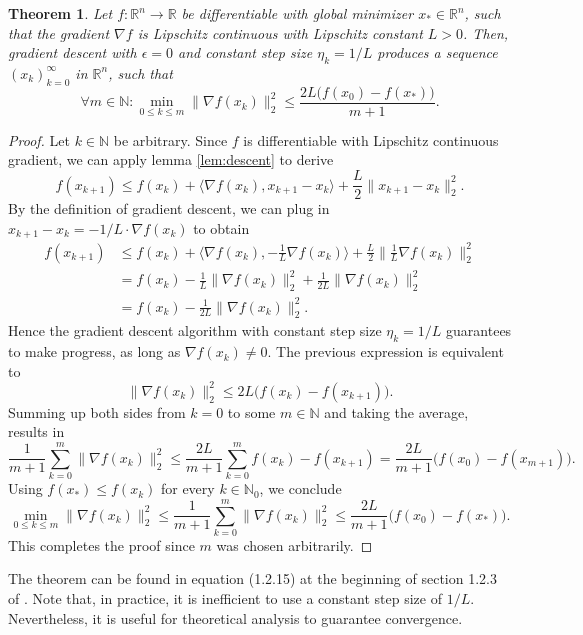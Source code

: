 \documentclass[11pt, a4paper]{article}
\newtheorem{theorem}{Theorem}[section]
\newcommand{\N}{\mathbb{N}}
\newcommand{\R}{\mathbb{R}}
\begin{document}
\begin{theorem} \label{thm:descent}
Let $f: \R^n \to \R$ be differentiable with global minimizer $x_* \in \R^n$, such that the gradient $\nabla f$ is Lipschitz continuous with Lipschitz constant $L>0$. Then, gradient descent with $\epsilon = 0$ and constant step size $\eta_k = 1/L$ produces a sequence $(x_k)_{k=0}^\infty$ in $\R^n$, such that 
\[ \forall m \in \N : \min_{0 \leq k \leq m} \big \| \nabla f(x_k) \big \|_2^2 \leq \frac{2L \big ( f(x_0) - f(x_*) \big )}{m+1}. \]
\end{theorem}

\begin{proof}
Let $k \in \N$ be arbitrary. Since $f$ is differentiable with Lipschitz continuous gradient, we can apply lemma \ref{lem:descent} to derive
\[  f(x_{k+1}) \leq f(x_k) + \big \langle \nabla f(x_k) , x_{k+1} -x_k \big \rangle + \frac{L}{2} \big \| x_{k+1} - x_k \big \|_2^2. \]
By the definition of gradient descent, we can plug in $x_{k+1} - x_k = - 1/L \cdot \nabla f(x_k)$ to obtain
\[ \begin{split} 
f(x_{k+1}) 
&\leq f(x_k) + \big \langle \nabla f(x_k) , - \frac{1}{L} \nabla f(x_k) \big \rangle + \frac{L}{2} \big \| \frac{1}{L} \nabla f(x_k) \big \|_2^2 \\\
&= f(x_k) - \frac{1}{L} \big \| \nabla f(x_k) \big \|_2^2 + \frac{1}{2L} \big \| \nabla f(x_k) \big \|_2^2 \\\
&= f(x_k) - \frac{1}{2L} \big \| \nabla f(x_k) \big \|_2^2.
\end{split} \]
Hence the gradient descent algorithm with constant step size $\eta_k = 1/L$ guarantees to make progress, as long as $\nabla f(x_k) \neq 0$. The previous expression is equivalent to
\[ \big \| \nabla f(x_k) \big \|_2^2 \leq 2L \big ( f(x_k) - f(x_{k+1}) \big ). \]
Summing up both sides from $k=0$ to some $m \in \N$ and taking the average, results in
\[ \frac{1}{m+1} \sum_{k=0}^{m} \big \| \nabla f(x_k) \big \|_2^2 \leq \frac{2L}{m+1} \sum_{k=0}^{m} f(x_k) - f(x_{k+1}) = \frac{2L}{m+1} \big ( f(x_0) - f(x_{m+1}) \big ). \]
Using $f(x_*) \leq f(x_k)$ for every $k \in \N_0$, we conclude
\[ \min_{0 \leq k \leq m} \big \| \nabla f(x_k) \big \|_2^2 \leq \frac{1}{m+1} \sum_{k=0}^{m} \big \| \nabla f(x_k) \big \|_2^2 \leq \frac{2L}{m+1} \big ( f(x_0) - f(x_*) \big ). \]
This completes the proof since $m$ was chosen arbitrarily.
\end{proof}

The theorem can be found in equation (1.2.15) at the beginning of section 1.2.3 of \cite{ConvexOptimization}. Note that, in practice, it is inefficient to use a constant step size of $1/L$. Nevertheless, it is useful for theoretical analysis to guarantee convergence. \\
\end{document}
